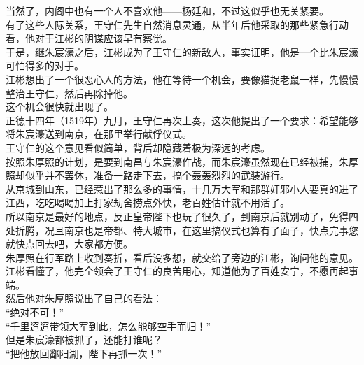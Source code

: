 \begin{multicols}{\theparacolNo}
当然了，内阁中也有一个人不喜欢他——杨廷和，不过这似乎也无关紧要。\\

有了这些人际关系，王守仁先生自然消息灵通，从半年后他采取的那些紧急行动看，他对于江彬的阴谋应该早有察觉。\\

于是，继朱宸濠之后，江彬成为了王守仁的新敌人，事实证明，他是一个比朱宸濠可怕得多的对手。\\

江彬想出了一个很恶心人的方法，他在等待一个机会，要像猫捉老鼠一样，先慢慢整治王守仁，然后再除掉他。\\

这个机会很快就出现了。\\

正德十四年（1519年）九月，王守仁再次上奏，这次他提出了一个要求：希望能够将朱宸濠送到南京，在那里举行献俘仪式。\\

王守仁的这个意见看似简单，背后却隐藏着极为深远的考虑。\\

按照朱厚照的计划，是要到南昌与朱宸濠作战，而朱宸濠虽然现在已经被捕，朱厚照却似乎并不罢休，准备一路走下去，搞个轰轰烈烈的武装游行。\\

从京城到山东，已经惹出了那么多的事情，十几万大军和那群奸邪小人要真的进了江西，吃吃喝喝加上打家劫舍捞点外快，老百姓估计就不用活了。\\

所以南京是最好的地点，反正皇帝陛下也玩了很久了，到南京后就别动了，免得四处折腾，况且南京也是帝都、特大城市，在这里搞仪式也算有了面子，快点完事您就快点回去吧，大家都方便。\\

朱厚照在行军路上收到奏折，看后没多想，就交给了旁边的江彬，询问他的意见。\\

江彬看懂了，他完全领会了王守仁的良苦用心，知道他为了百姓安宁，不愿再起事端。\\

然后他对朱厚照说出了自己的看法：\\

“绝对不可！”\\

“千里迢迢带领大军到此，怎么能够空手而归！”\\

但是朱宸濠都被抓了，还能打谁呢？\\

“把他放回鄱阳湖，陛下再抓一次！”\\


\end{multicols}
